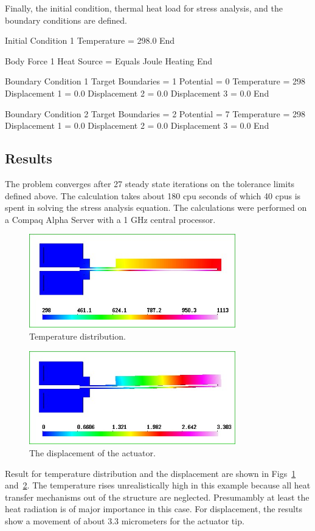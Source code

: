 Finally, the initial condition, thermal heat load for stress analysis,
and the boundary conditions are defined.

\ttbegin
Initial Condition 1
   Temperature = 298.0
End

Body Force 1
  Heat Source = Equals Joule Heating
End

Boundary Condition 1
  Target Boundaries = 1
  Potential = 0
  Temperature = 298
  Displacement 1 = 0.0
  Displacement 2 = 0.0
  Displacement 3 = 0.0
End

Boundary Condition 2
  Target Boundaries = 2
  Potential = 7
  Temperature = 298
  Displacement 1 = 0.0
  Displacement 2 = 0.0
  Displacement 3 = 0.0
End
\ttend

\subsection*{Results}

The problem converges after 27 steady state iterations on the
tolerance limits defined above. The calculation takes about 180 cpu
seconds of which 40 cpus is spent in solving the stress analysis
equation. The calculations were performed on a Compaq Alpha Server
with a 1 GHz central processor.

\begin{figure}[tbhp]
  \centerline{\includegraphics[width=0.8\textwidth]{temp_wh}}
  \caption{Temperature distribution.} 
  \label{temp_thermal}
\end{figure}
\begin{figure}[h]
  \centerline{\includegraphics[width=0.8\textwidth]{displ_wh}}
  \caption{The displacement of the actuator.} 
  \label{displ_thermal}
\end{figure}

Result for temperature distribution and the displacement are shown in
Figs~\ref{temp_thermal} and~\ref{displ_thermal}. The temperature rises
unrealistically high in this example because all heat transfer
mechanisms out of the structure are neglected. Presumambly at least
the heat radiation is of major importance in this case. For
displacement, the results show a movement of about 3.3 micrometers for
the actuator tip.

\vfill
\mbox{}

